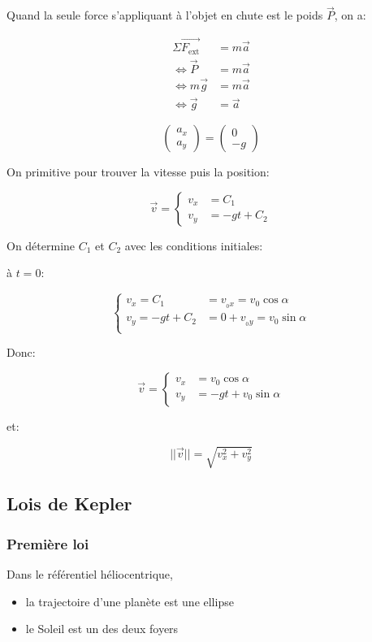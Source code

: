 \documentclass{article}
\newcommand{\vect}{\overrightarrow}
\begin{document}
Quand la seule force s'appliquant à l'objet en chute est le poids $\vec{P}$, on a:

\begin{equation*}
    \begin{split}
        \Sigma \vect{F_\text{ext}} &= m \vec a \\
        \iff \vec P &= m \vec a\\
        \iff m \vec g &= m \vec a \\
        \iff \vec g &= \vec a
    \end{split}
\end{equation*}

$$
\begin{pmatrix}
a_x \\ a_y
\end{pmatrix} = \begin{pmatrix}
0 \\ -g
\end{pmatrix}
$$

On primitive pour trouver la vitesse puis la position:

$$
\vec v = \begin{cases}
v_x &= C_1 \\
v_y &= -gt + C_2
\end{cases}
$$

On détermine $C_1$ et $C_2$ avec les conditions initiales:

à $t=0$:

$$
\begin{cases}
v_x = C_1 &= v_{_0x} = v_0 \cos \alpha \\
v_y = -gt + C_2 &= 0 + v_{_0y} = v_0 \sin \alpha \\
\end{cases}
$$

Donc: 

$$
\vec v = \begin{cases}
v_x &= v_0 \cos \alpha \\
v_y &= -gt + v_0\sin\alpha
\end{cases}
$$

et:

$$||\vec v|| = \sqrt{v_x^2 + v_y^2}$$

\subsection{Lois de Kepler}

\subsubsection{Première loi}
Dans le référentiel héliocentrique, 
\begin{itemize}
    \item la trajectoire d'une planète est une ellipse 
    \item le Soleil est un des deux foyers
\end{itemize}
\end{document}
